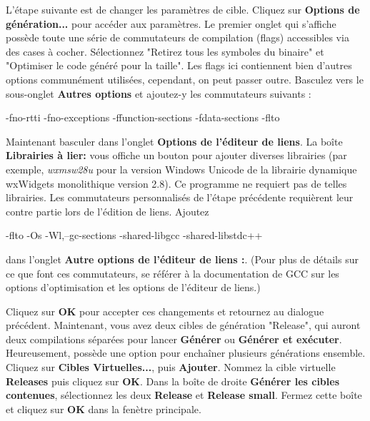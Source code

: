 
L'étape suivante est de changer les paramètres de cible. Cliquez sur \textbf{Options de génération...} pour accéder aux paramètres. Le premier onglet qui s'affiche possède toute une série de commutateurs de compilation (flags) accessibles via des cases à cocher. Sélectionnez "Retirez tous les symboles du binaire" et "Optimiser le code généré pour la taille". Les flags ici contiennent bien d'autres options communément utilisées, cependant, on peut passer outre. Basculez vers le sous-onglet \textbf{Autres options} et ajoutez-y les commutateurs suivants :

\begin{code}
-fno-rtti
-fno-exceptions
-ffunction-sections
-fdata-sections
-flto
\end{code}

Maintenant basculer dans l'onglet \textbf{Options de l'éditeur de liens}. La boîte \textbf{Librairies à lier:} vous offiche un bouton pour ajouter diverses librairies (par exemple, \textit{wxmsw28u} pour la version Windows Unicode de la librairie dynamique wxWidgets monolithique version 2.8). Ce programme ne requiert pas de telles librairies. Les  commutateurs personnalisés de l'étape précédente requièrent leur contre partie lors de l'édition de liens. Ajoutez

\begin{code}
-flto
-Os
-Wl,--gc-sections
-shared-libgcc
-shared-libstdc++
\end{code}

dans l'onglet \textbf{Autre options de l'éditeur de liens :}. (Pour plus de détails sur ce que font ces commutateurs, se référer à la documentation de GCC sur les options d'optimisation et les options de l'éditeur de liens.)


Cliquez sur \textbf{OK} pour accepter ces changements et retournez au dialogue précédent. Maintenant, vous avez deux cibles de génération "Release", qui auront deux compilations séparées pour lancer \textbf{Générer} ou \textbf{Générer et exécuter}. Heureusement, \codeblocks possède une option pour enchaîner plusieurs générations ensemble. Cliquez sur \textbf{Cibles Virtuelles...}, puis \textbf{Ajouter}. Nommez la cible virtuelle \textbf{Releases} puis cliquez sur \textbf{OK}. Dans la boîte de droite \textbf{Générer les cibles contenues}, sélectionnez les deux \textbf{Release} et \textbf{Release small}. Fermez cette boîte et cliquez sur \textbf{OK} dans la fenètre principale. 

